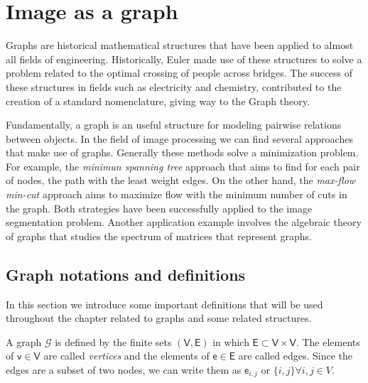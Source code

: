 \section{Image as a graph}

Graphs are historical mathematical structures that have been applied to almost all fields of engineering. Historically, Euler made use of these structures to solve a problem related to the optimal crossing of people across bridges. The success of these structures in fields such as electricity and chemistry, contributed to the creation of a standard nomenclature, giving way to the Graph theory.

Fundamentally, a graph is an useful structure for modeling pairwise relations between objects. In the field of image processing we can find several approaches that make use of graphs. Generally these methods solve a minimization problem. For example, the \textit{minimun spanning tree} approach that aims to find for each pair of nodes, the path with the least weight edges. On the other hand, the \textit{max-flow min-cut} approach aims to maximize flow with the minimum number of cuts in the graph. Both strategies have been successfully applied to the image segmentation problem. Another application example involves the algebraic theory of graphs that studies the spectrum of matrices that represent graphs.



\subsection{Graph notations and definitions}

In this section we introduce some important definitions that will be used throughout the chapter related to graphs and some related structures.

\begin{definition}[Graph]
	A graph $\mathcal{G}$ is defined by the finite sets $(\mathsf{V}, \mathsf{E})$ in which $\mathsf{E} \subset \mathsf{V} \times \mathsf{V}$. The elements of $\mathsf{v} \in \mathsf{V}$ are called \textit{vertices} and the elements of $\mathsf{e} \in \mathsf{E}$ are called edges. Since the edges are a subset of two nodes, we can write them as $\mathsf{e}_{i,j}$ or $\{i,j\} \forall i, j \in V$.
\end{definition}

\begin{definition}[Neighborhood]

\end{definition}

